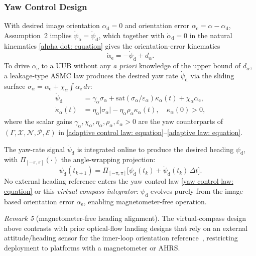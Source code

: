 \documentclass{IEEEtaes}
\begin{document}
\subsubsection{Yaw Control Design} \label{yaw control: section}
With desired image orientation $\alpha_\text{d}=0$ and orientation error $\alpha_\text{e}=\alpha-\alpha_\text{d}$, Assumption~2 implies $\dot{\psi}_\text{b}=\dot{\psi}_\text{d}$, which together with $\dot{\alpha}_\text{d}=0$ in the natural kinematics \eqref{alpha dot: equation} gives the orientation-error kinematics
\begin{equation} \label{alpha_e_dot: equation}
    \dot{\alpha}_\text{e} = -\dot{\psi}_\text{d} + d_{\alpha}.
\end{equation}
To drive $\alpha_\text{e}$ to a UUB without any \emph{a priori} knowledge of the upper bound of $d_{\alpha}$, a leakage-type ASMC law produces the desired yaw rate $\dot{\psi}_\text{d}$ via the sliding surface $\sigma_{\alpha}=\alpha_\text{e}+\chi_{\alpha}\!\int\alpha_\text{e}\,d\tau$:
\begin{align} \label{yaw control law: equation}
    \dot{\psi}_\text{d} &= \gamma_{\alpha}\sigma_{\alpha} + \text{sat}(\sigma_{\alpha}/\varepsilon_{\alpha})\kappa_{\alpha}(t) + \chi_{\alpha} \alpha_\text{e}, \nonumber\\
    \dot{\kappa}_{\alpha}(t) &= \eta_{\alpha}|\sigma_{\alpha}| - \eta_{\alpha}\rho_{\alpha}\kappa_{\alpha}(t),\quad\kappa_{\alpha}(0)>0,
\end{align}
where the scalar gains $\gamma_{\alpha}, \chi_{\alpha}, \eta_{\alpha}, \rho_{\alpha}, \varepsilon_{\alpha} > 0$ are the yaw counterparts of $(\Gamma,\mathcal{X},\mathcal{N},\mathcal{P},\mathcal{E})$ in \eqref{adaptive control law: equation}--\eqref{adaptive law: equation}.

The yaw-rate signal $\dot{\psi}_\text{d}$ is integrated online to produce the desired heading $\psi_\text{d}$, with $\Pi_{[-\pi,\pi]}(\cdot)$ the angle-wrapping projection:
\begin{equation} \label{psi d integrator: equation}
    \psi_\text{d}(t_{k+1}) = \Pi_{[-\pi,\pi]}\!\big[\psi_\text{d}(t_k) + \dot{\psi}_\text{d}(t_k)\,\Delta t\big].
\end{equation}
No external heading reference enters the yaw control law \eqref{yaw control law: equation} or this \emph{virtual-compass integrator}: $\psi_\text{d}$ evolves purely from the image-based orientation error $\alpha_\text{e}$, enabling magnetometer-free operation.

\textit{Remark 5} (magnetometer-free heading alignment). The virtual-compass design above contrasts with prior optical-flow landing designs that rely on an external attitude/heading sensor for the inner-loop orientation reference~\cite{herisse2012}, restricting deployment to platforms with a magnetometer or AHRS.
\end{document}
